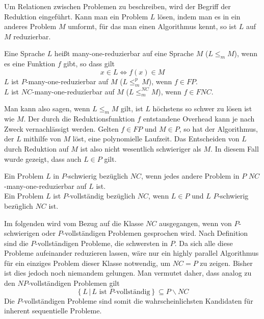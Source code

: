 Um Relationen zwischen Problemen zu beschreiben, wird der Begriff der
Reduktion eingeführt.
Kann man ein Problem $L$ lösen, indem man es in ein anderes Problem $M$ umformt,
für das man einen Algorithmus kennt, so ist $L$ auf $M$ reduzierbar.
%
\begin{define}
    Eine Sprache $L$ heißt many-one-reduzierbar auf eine Sprache $M$
    ($L \leq_m M$), wenn es eine Funktion $f$ gibt, so dass gilt
    \begin{equation}
        x \in L \Leftrightarrow f(x) \in M
    \end{equation}
    $L$ ist $P$-many-one-reduzierbar auf $M$ ($L \leq_m^p M$), wenn $f \in FP$. \\
    $L$ ist $NC$-many-one-reduzierbar auf $M$ ($L \leq_m^{NC} M$), wenn $f \in FNC$.
    \cite[S.47]{greenlaw}
\end{define}
%
Man kann also sagen, wenn $L \leq_m M$ gilt, ist $L$ höchstens so schwer zu
lösen ist wie $M$.
Der durch die Reduktionsfunktion $f$ entstandene Overhead kann je nach Zweck
vernachlässigt werden.
Gelten $f \in FP$ und $M \in P$, so hat der Algorithmus, der $L$ mithilfe von
$M$ löst, eine polynomielle Laufzeit.
Das Entscheiden von $L$ durch Reduktion auf $M$ ist also nicht wesentlich
schwieriger als $M$.
In diesem Fall wurde gezeigt, dass auch $L \in P$ gilt.

\begin{define}
    Ein Problem $L$ in $P$-schwierig bezüglich $NC$, wenn jedes andere Problem
    in $P$ $NC$-many-one-reduzierbar auf $L$ ist. \\
    Ein Problem $L$ ist $P$-vollständig bezüglich $NC$, wenn $L \in P$ und $L$
    $P$-schwierig bezüglich $NC$ ist.
\end{define}
Im folgenden wird vom Bezug auf die Klasse $NC$ ausgegangen, wenn von
$P$-schwierigen oder $P$-vollständigen Problemen gesprochen wird.
%
Nach Definition sind die $P$-vollständigen Probleme, die schwersten in $P$.
Da sich alle diese Probleme aufeinander reduzieren lassen, wäre nur ein highly
parallel Algorithmus für ein einziges Problem dieser Klasse notwendig, um
$NC = P$ zu zeigen.
Bisher ist dies jedoch noch niemandem gelungen.
Man vermutet daher, dass analog zu den $NP$-vollständigen Problemen gilt
\begin{equation}
    \left\{ L \, | \, L \text{ ist $P$-vollständig} \right\} \subseteq P \backslash NC
\end{equation}
Die $P$-vollständigen Probleme sind somit die wahrscheinlichsten Kandidaten
für inherent sequentielle Probleme.
\cite[S.54ff]{greenlaw}\cite[S.535]{jaja}
